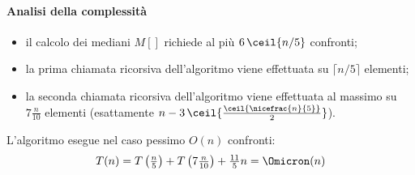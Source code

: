 \paragraph{Analisi della complessità}


\begin{itemize}
	\item[\circled{\ref{select:calcolo-mediana}}]
	il calcolo dei mediani \(M[]\) richiede al più \(6\, \ceil{n/5}\)  confronti;

	\item[\circled{\ref{select:ricorsiva-prima}}]
	la prima chiamata ricorsiva dell'algoritmo \select viene effettuata su \(\lceil n/5 \rceil\) elementi;

	\item[\circled{\ref{select:ricorsiva-seconda}}]
	la seconda chiamata ricorsiva dell'algoritmo \select viene effettuata al massimo  su \(7 \frac{n}{10}\) elementi (esattamente \(n - 3\, \ceil{ \frac{ \ceil{\nicefrac{n}{5}} }{2} }\)).
\end{itemize}

L'algoritmo \select esegue nel caso pessimo \(O(n)\) confronti:
\begin{equation*}\textstyle
T(n) = T\left( \frac{n}{5} \right) + T\left( 7 \frac{n}{10} \right) + \frac{11}{5} n = \Omicron(n)
\end{equation*}

\ifsubfile

\fi

